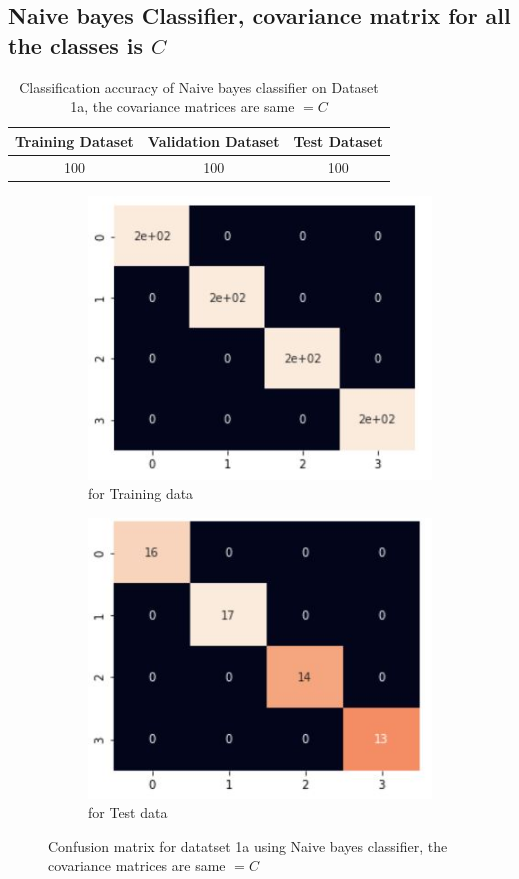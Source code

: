 \documentclass[11pt]{article}
\begin{document}
\newpage
\subsection{Naive bayes Classifier, covariance matrix for all the classes is $C$}

\begin{table}[h!]
\label{tab:tab1.1.1}
\begin{center}
\begin{tabular}{|c|c|c|}
\hline
\textbf{Training Dataset} & \textbf{Validation Dataset} &\textbf{Test Dataset}\\
\hline
100 & 100 & 100\\
\hline
\end{tabular}
\caption{Classification accuracy of Naive bayes classifier on Dataset 1a, the covariance matrices are same $= C$}
\end{center}
\end{table}

\begin{figure}[h]
\centering
	\begin{subfigure}[b]{0.45\textwidth}
	\centering
	\includegraphics[scale=0.6]{dataset1a_nb_sameC_hm_train.jpg}
	\caption{for Training data}
	\label{fig:fig2.2.3.1}
	\end{subfigure}
	\hfill
	\begin{subfigure}[b]{0.45\textwidth}
	\centering
	\includegraphics[scale=0.6]{dataset1a_nb_sameC_hm_test.jpg}
	\caption{for Test data}
	\label{fig:fig2.2.3.2}
	\end{subfigure}
\caption{Confusion matrix for datatset 1a using Naive bayes classifier, the covariance matrices are same $= C$}
\label{fig:fig1.2.1}
\end{figure}
\end{document}
